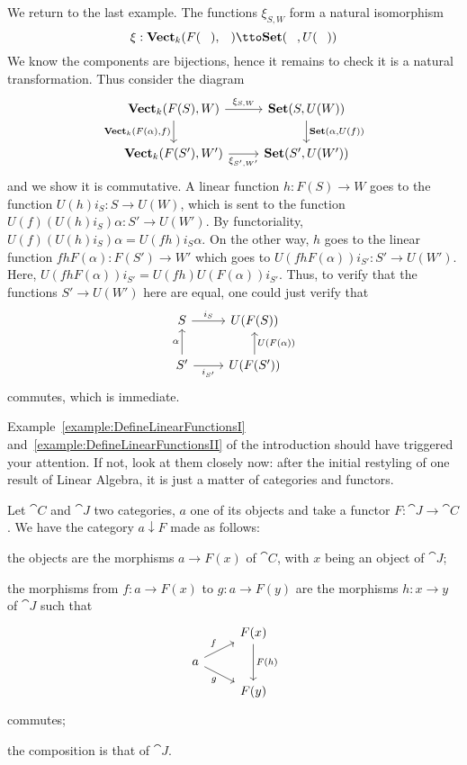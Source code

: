\begin{example}\label{example:DefineLinearFunctionsII}
We return to the last example. The functions \(\xi_{S,W}\) form a natural isomorphism
\[\xi : \Vect_k(F(\hole), \hole) \tto \Set(\hole, U(\hole))\]
We know the components are bijections, hence it remains to check it is a natural transformation. Thus consider the diagram
%
\[\begin{tikzcd}
\Vect_k(F(S), W) \ar["{\Vect_k(F(\alpha), f)}", d, swap] \ar["{\xi_{S,W}}", r] & \Set(S, U(W)) \ar["{\Set(\alpha, U(f))}", d] \\
\Vect_k(F(S'), W') \ar["{\xi_{S',W'}}", r, swap] & \Set(S', U(W'))
\end{tikzcd}\]
%
and we show it is commutative. A linear function \(h : F(S) \to W\) goes to the function \(U(h)i_S : S \to U(W)\), which is sent to the function \(U(f) (U(h)i_S) \alpha : S' \to U(W')\). By functoriality, \(U(f) (U(h)i_S) \alpha = U(fh) i_S \alpha\). On the other way, \(h\) goes to the linear function \(f h F(\alpha) : F(S') \to W'\) which goes to \(U(f h F(\alpha)) i_{S'} : S' \to U(W')\). Here, \(U(f h F(\alpha)) i_{S'} = U(fh) U(F(\alpha))i_{S'}\). Thus, to verify that the functions \(S' \to U(W')\) here are equal, one could just verify that
\[\begin{tikzcd}
S \ar["{i_S}", r] & U(F(S)) \\
S' \ar["\alpha", u] \ar["{i_{S'}}", r, swap] & U(F(S')) \ar["U(F(\alpha))", u, swap]
\end{tikzcd}\]
commutes, which is immediate.
\end{example}

Example~\ref{example:DefineLinearFunctionsI} and~\ref{example:DefineLinearFunctionsII} of the introduction should have triggered your attention. If not, look at them closely now: after the initial restyling of one result of Linear Algebra, it is just a matter of categories and functors. 

\begin{construction}
Let \(\cat C\) and \(\cat J\) two categories, \(a\) one of its objects and take a functor \(F : \cat J \to \cat C\). We have the category \(a {\downarrow} F\) made as follows:
\begin{tcbitem}
\item the objects are the morphisms \(a \to F(x)\) of \(\cat C\), with \(x\) being an object of \(\cat J\);
\item the morphisms from \(f : a \to F(x)\) to \(g : a \to F(y)\) are the morphisms \(h : x \to y\) of \(\cat J\) such that
\[\begin{tikzcd}[row sep=small]
 & F(x) \ar["{F(h)}", dd] \\
a \ar["f", ur] \ar["g", dr, swap] \\
 & F(y)
\end{tikzcd}\]
commutes;
\item the composition is that of \(\cat J\). 
\end{tcbitem}
\end{construction}

